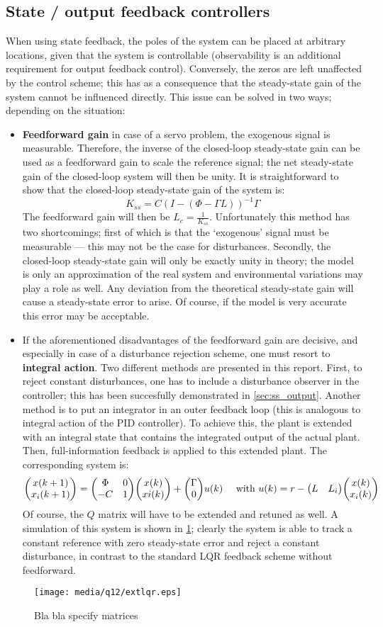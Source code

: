 \subsection*{State / output feedback controllers}
When using state feedback, the poles of the system can be placed at arbitrary locations, given that the system is controllable (observability is an additional requirement for output feedback control). Conversely, the zeros are left unaffected by the control scheme; this has as a consequence that the steady-state gain of the system cannot be influenced directly. This issue can be solved in two ways; depending on the situation:
\begin{itemize}
    \item \textbf{Feedforward gain} in case of a servo problem, the exogenous signal is measurable. Therefore, the inverse of the closed-loop steady-state gain can be used as a feedforward gain to scale the reference signal; the net steady-state gain of the closed-loop system will then be unity. It is straightforward to show that the closed-loop steady-state gain of the system is:
    $$ K_{ss} = C(I - (\Phi - \Gamma L))^{-1}\Gamma$$
    The feedforward gain will then be $L_c = \frac{1}{K_{ss}}$. Unfortunately this method has two shortcomings; first of which is that the `exogenous' signal must be measurable --- this may not be the case for disturbances. Secondly, the closed-loop steady-state gain will only be exactly unity in theory; the model is only an approximation of the real system and environmental variations may play a role as well. Any deviation from the theoretical steady-state gain will cause a steady-state error to arise. Of course, if the model is very accurate this error may be acceptable. \cite{keviczky}
    \item If the aforementioned disadvantages of the feedforward gain are decisive, and especially in case of a disturbance rejection scheme, one must resort to \textbf{integral action}. Two different methods are presented in this report. First, to reject constant disturbances, one has to include a disturbance observer in the controller; this has been succesfully demonstrated in \cref{sec:ss_output}. Another method is to put an integrator in an outer feedback loop (this is analogous to integral action of the PID controller). To achieve this, the plant is extended with an integral state that contains the integrated output of the actual plant. Then, full-information feedback is applied to this extended plant. The corresponding system is:
        $$ \mqty(x(k+1)\\x_i(k+1)) = \mqty(\Phi & 0 \\ -C & 1)\mqty(x(k)\\xi(k)) + \mqty(\Gamma\\0)u(k)\quad\text{ with }u(k) = r - \mqty(L & L_i)\mqty(x(k)\\x_i(k))$$ 
    Of course, the $Q$ matrix will have to be extended and retuned as well. A simulation of this system is shown in \cref{fig:q12_extlqr}; clearly the system is able to track a constant reference with zero steady-state error and reject a constant disturbance, in contrast to the standard LQR feedback scheme without feedforward.
\end{itemize}
\begin{figure}
    \centering
    \texttt{[image: media/q12/extlqr.eps]}
    \caption{Bla bla specify matrices}
    \label{fig:q12_extlqr}
\end{figure}